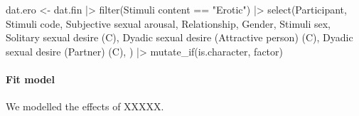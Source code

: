 \documentclass[
  bookmarksnumbered]{article}
\newenvironment{Shaded}{\begin{snugshade}}{\end{snugshade}}
\newcommand{\AttributeTok}[1]{\textcolor[rgb]{0.80,0.80,0.80}{#1}}
\newcommand{\FunctionTok}[1]{\textcolor[rgb]{0.94,0.94,0.56}{#1}}
\newcommand{\NormalTok}[1]{\textcolor[rgb]{0.80,0.80,0.80}{#1}}
\newcommand{\OtherTok}[1]{\textcolor[rgb]{0.94,0.94,0.56}{#1}}
\newcommand{\SpecialCharTok}[1]{\textcolor[rgb]{0.86,0.64,0.64}{#1}}
\newcommand{\StringTok}[1]{\textcolor[rgb]{0.80,0.58,0.58}{#1}}
\begin{document}
\begin{Shaded}
\begin{Highlighting}[]
\NormalTok{dat.ero }\OtherTok{\textless{}{-}}\NormalTok{ dat.fin }\SpecialCharTok{|\textgreater{}}
  \FunctionTok{filter}\NormalTok{(}\StringTok{\textasciigrave{}}\AttributeTok{Stimuli content}\StringTok{\textasciigrave{}} \SpecialCharTok{==} \StringTok{"Erotic"}\NormalTok{)  }\SpecialCharTok{|\textgreater{}} 
  \FunctionTok{select}\NormalTok{(Participant, }\StringTok{\textasciigrave{}}\AttributeTok{Stimuli code}\StringTok{\textasciigrave{}}\NormalTok{, }
         \StringTok{\textasciigrave{}}\AttributeTok{Subjective sexual arousal}\StringTok{\textasciigrave{}}\NormalTok{, }
\NormalTok{         Relationship, }
\NormalTok{         Gender, }
         \StringTok{\textasciigrave{}}\AttributeTok{Stimuli sex}\StringTok{\textasciigrave{}}\NormalTok{, }
         \StringTok{\textasciigrave{}}\AttributeTok{Solitary sexual desire (C)}\StringTok{\textasciigrave{}}\NormalTok{,}
         \StringTok{\textasciigrave{}}\AttributeTok{Dyadic sexual desire (Attractive person) (C)}\StringTok{\textasciigrave{}}\NormalTok{, }
         \StringTok{\textasciigrave{}}\AttributeTok{Dyadic sexual desire (Partner) (C)}\StringTok{\textasciigrave{}}\NormalTok{, ) }\SpecialCharTok{|\textgreater{}} 
  \FunctionTok{mutate\_if}\NormalTok{(is.character, factor)}
\end{Highlighting}
\end{Shaded}

\hypertarget{fit-model-1}{%
\paragraph{Fit model}\label{fit-model-1}}

We modelled the effects of XXXXX.
\end{document}
